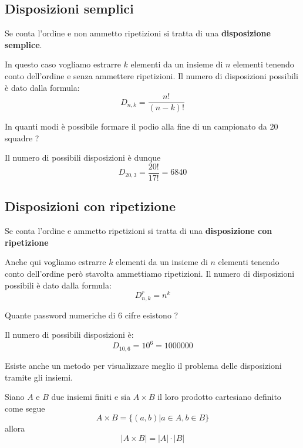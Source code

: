 \subsection{Disposizioni semplici}
\begin{defn}
	Se conta l'ordine e non ammetto ripetizioni si tratta di una \textbf{disposizione semplice}.
\end{defn}

In questo caso vogliamo estrarre $k$ elementi da un insieme di $n$ elementi tenendo conto
dell'ordine e senza ammettere ripetizioni.
Il numero di disposizioni possibili \`e dato dalla formula:
\begin{equation*}
	D_{n, k} = \frac{n!}{(n - k)!}
\end{equation*}

\begin{example}
	In quanti modi \`e possibile formare il podio alla fine di un campionato da 20 squadre ?

	Il numero di possibili disposizioni \`e dunque
	\begin{equation*}
		D_{20, 3} = \frac{20!}{17!} = 6840
	\end{equation*}
\end{example}

\subsection{Disposizioni con ripetizione}
\begin{defn}
	Se conta l'ordine e ammetto ripetizioni si tratta di una \textbf{disposizione con ripetizione}
\end{defn}

Anche qui vogliamo estrarre $k$ elementi da un insieme di $n$ elementi tenendo conto dell'ordine
per\`o stavolta ammettiamo ripetizioni.
Il numero di disposizioni possibili \`e dato dalla formula:
\begin{equation*}
	D_{n, k}^r = n^k
\end{equation*}

\begin{example}
	Quante password numeriche di 6 cifre esistono ?

	Il numero di possibili disposizioni \`e:
	\begin{equation*}
		D_{10, 6} = 10^6 = 1000000
	\end{equation*}
\end{example}

Esiste anche un metodo per visualizzare meglio il problema delle disposizioni tramite gli insiemi.
\begin{theorem}
	Siano $A$ e $B$ due insiemi finiti e sia $A \times B$ il loro prodotto cartesiano definito
	come segue
	\begin{equation*}
		A \times B = \{ (a, b) | a \in A, b \in B \}
	\end{equation*}
	allora
	\begin{equation*}
		|A \times B| = |A| \cdot |B|
	\end{equation*}
\end{theorem}

